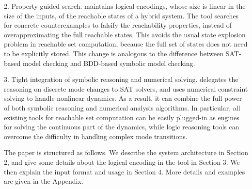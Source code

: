 2. Property-guided search. \dReach{} maintains logical encodings, whose size is linear in the size of the inputs, of the reachable states of
a hybrid system. The tool searches for concrete counterexamples to falsify the reachability properties, instead of overapproximating the full reachable states.
This avoids the usual state explosion problem in reachable set computation, because the full set of states does not need to be explicitly stored. This change
is analogous to the difference between SAT-based model checking and BDD-based symbolic model checking.

3. Tight integration of symbolic reasoning and numerical solving. \dReach{} delegates the
reasoning on discrete mode changes to SAT solvers, and uses numerical constraint solving to handle nonlinear dynamics.
As a result, it can combine the full power of both symbolic reasoning and numerical analysis algorithms. In particular,
all existing tools for reachable set computation can be easily plugged-in as engines for solving
the continuous part of the dynamics, while logic reasoning tools can overcome the difficulty
in handling complex mode transitions.

The paper is structured as follows. We describe the system architecture in Section 2,
and give some details about the logical encoding in the tool in Section 3.
We then explain the input format and usage in Section 4. More details and examples are given in the Appendix.




\newpage
